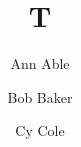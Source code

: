 \documentclass{article}
\title{T}
\author{Ann Able\footnotemark[1] \and \renewcommand{\thefootnote}{\arabic{footnote}}Bob Baker\footnotemark[2] \and Cy Cole\footnotemark[3]}
\date{}

\maketitle
Body.

